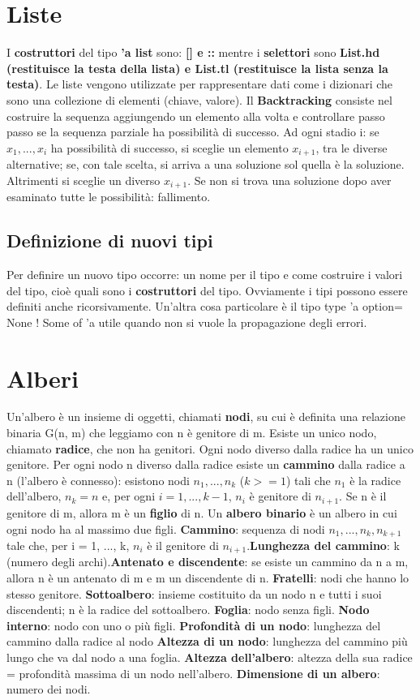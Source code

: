 \documentclass{article}
\numberwithin{equation}{subsection}
\begin{document}
\section{Liste}
I \textbf{costruttori} del tipo \textbf{'a list} sono: \textbf{[] e ::} mentre i \textbf{selettori} sono \textbf{List.hd (restituisce la testa della lista) e List.tl (restituisce la lista senza la testa)}. Le liste vengono utilizzate per rappresentare dati come i dizionari che sono una collezione di elementi (chiave, valore).
Il \textbf{Backtracking} consiste nel costruire la sequenza aggiungendo un elemento alla volta e controllare passo passo se la sequenza parziale  ha possibilità di successo. Ad ogni stadio i: se $x_1,...,x_i$ ha possibilità di successo, si sceglie un elemento $x_{i+1}$, tra le diverse alternative; se, con tale scelta, si arriva a una soluzione sol quella è la soluzione. Altrimenti si sceglie un diverso $x_{i+1}$. Se non si trova una soluzione dopo aver esaminato tutte le possibilità: fallimento.
\subsection{Definizione di nuovi tipi}
Per definire un nuovo tipo occorre: un nome per il tipo e come costruire i valori del tipo, cioè quali sono i \textbf{costruttori} del tipo. Ovviamente i tipi possono essere definiti anche ricorsivamente. Un'altra cosa particolare è il tipo type 'a option= None ! Some of 'a utile quando non si vuole la propagazione degli errori.
\section{Alberi}
Un'albero è un insieme di oggetti, chiamati \textbf{nodi}, su cui è definita una relazione binaria G(n, m) che leggiamo con n è genitore di m. Esiste un unico nodo, chiamato \textbf{radice}, che non ha genitori. Ogni nodo diverso dalla radice ha un unico genitore. Per ogni nodo n diverso dalla radice esiste un \textbf{cammino} dalla radice a n (l'albero è connesso): esistono nodi $n_1,...,n_k$ ($k>=1$) tali che $n_1$ è la radice dell'albero, $n_k=n$ e, per ogni $i=1,...,k-1$, $n_i$ è genitore di $n_{i+1}$. Se n è il genitore di m, allora m è un \textbf{figlio} di n. Un \textbf{albero binario} è un albero in cui ogni nodo ha al massimo due figli. \textbf{Cammino}: sequenza di nodi $n_1, ..., n_k , n_{k+1}$ tale che, per i = 1, ..., k, $n_i$ è il genitore di $n_{i+1}$.\textbf{Lunghezza del cammino}: k (numero degli archi).\textbf{Antenato e discendente}: se esiste un cammino da n a m, allora n è un antenato di m e m un discendente di n. \textbf{Fratelli}: nodi che hanno lo stesso genitore. \textbf{Sottoalbero}: insieme costituito da un nodo n e tutti i suoi discendenti; n è la radice del sottoalbero. \textbf{Foglia}: nodo senza figli. \textbf{Nodo interno}: nodo con uno o più figli. \textbf{Profondità di un nodo}: lunghezza del cammino dalla radice al nodo
\textbf{Altezza di un nodo}: lunghezza del cammino più lungo che va dal nodo a una foglia. \textbf{Altezza dell’albero}: altezza della sua radice = profondità massima di un nodo nell’albero. \textbf{Dimensione di un albero}: numero dei nodi.
\end{document}
